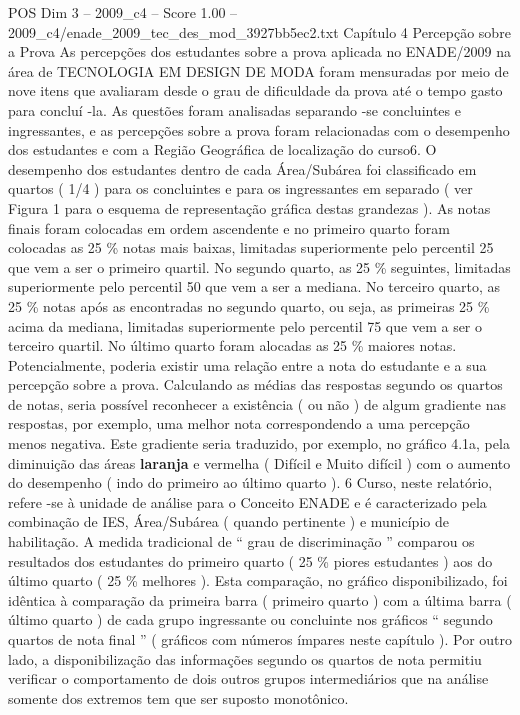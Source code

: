 \begin{textsample}{POS Dim 3 – 2009\_c4 – Score 1.00 – 2009\_c4/enade\_2009\_tec\_des\_mod\_3927bb5ec2.txt}  \label{ex:f3_pos_128}
Capítulo 4 Percepção sobre a Prova As percepções dos estudantes sobre a prova aplicada no ENADE/2009 na área de TECNOLOGIA EM DESIGN DE MODA foram mensuradas por meio de nove itens que avaliaram desde o grau de dificuldade da prova até o tempo gasto para concluí -la.
As questões foram analisadas separando -se concluintes e ingressantes, e as percepções sobre a prova foram relacionadas com o desempenho dos estudantes e com a Região Geográfica de localização do curso6.
O desempenho dos estudantes dentro de cada Área/Subárea foi classificado em quartos ( 1/4 ) para os concluintes e para os ingressantes em separado ( ver Figura 1 para o esquema de representação gráfica destas grandezas ).
As notas finais foram colocadas em ordem ascendente e no primeiro quarto foram colocadas as 25 \% notas mais baixas, limitadas superiormente pelo percentil 25 que vem a ser o primeiro quartil.
No segundo quarto, as 25 \% seguintes, limitadas superiormente pelo percentil 50 que vem a ser a mediana.
No terceiro quarto, as 25 \% notas após as encontradas no segundo quarto, ou seja, as primeiras 25 \% acima da mediana, limitadas superiormente pelo percentil 75 que vem a ser o terceiro quartil.
No último quarto foram alocadas as 25 \% maiores notas.
Potencialmente, poderia existir uma relação entre a nota do estudante e a sua percepção sobre a prova.
Calculando as médias das respostas segundo os quartos de notas, seria possível reconhecer a existência ( ou não ) de algum gradiente nas respostas, por exemplo, uma melhor nota correspondendo a uma percepção menos negativa.
Este gradiente seria traduzido, por exemplo, no gráfico 4.1a, pela diminuição das áreas \textbf{laranja} e vermelha ( Difícil e Muito difícil ) com o aumento do desempenho ( indo do primeiro ao último quarto ). 6 Curso, neste relatório, refere -se à unidade de análise para o Conceito ENADE e é caracterizado pela combinação de IES, Área/Subárea ( quando pertinente ) e município de habilitação.
A medida tradicional de “ grau de discriminação ” comparou os resultados dos estudantes do primeiro quarto ( 25 \% piores estudantes ) aos do último quarto ( 25 \% melhores ).
Esta comparação, no gráfico disponibilizado, foi idêntica à comparação da primeira barra ( primeiro quarto ) com a última barra ( último quarto ) de cada grupo ingressante ou concluinte nos gráficos “ segundo quartos de nota final ” ( gráficos com números ímpares neste capítulo ).
Por outro lado, a disponibilização das informações segundo os quartos de nota permitiu verificar o comportamento de dois outros grupos intermediários que na análise somente dos extremos tem que ser suposto monotônico.

\end{textsample}
